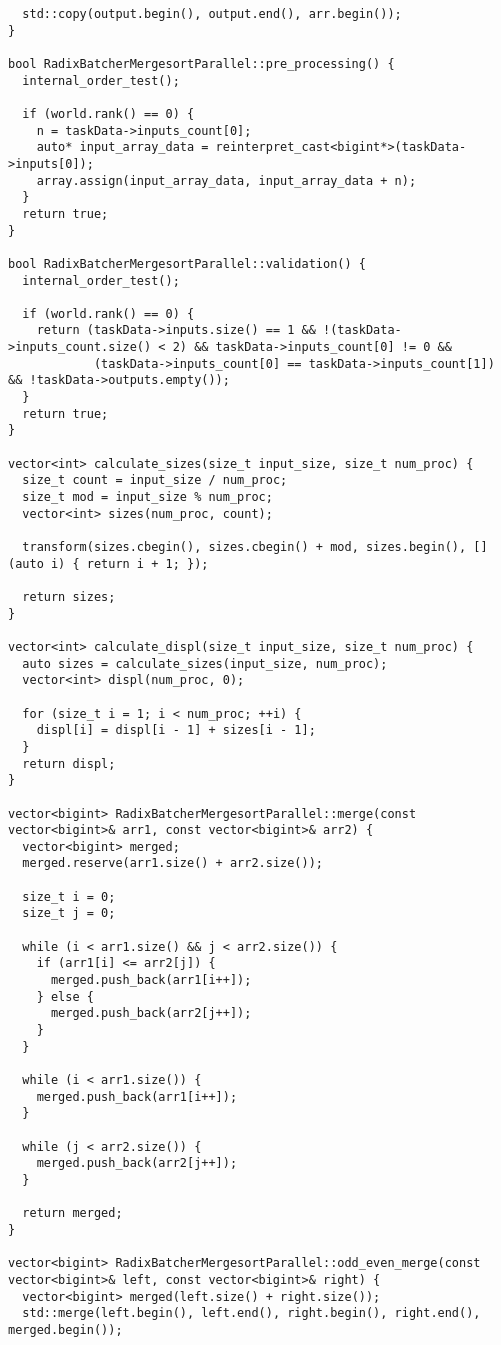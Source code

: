 ﻿\documentclass[a4paper,12pt]{article}
\begin{document}
\begin{lstlisting}
  std::copy(output.begin(), output.end(), arr.begin());
}

bool RadixBatcherMergesortParallel::pre_processing() {
  internal_order_test();

  if (world.rank() == 0) {
    n = taskData->inputs_count[0];
    auto* input_array_data = reinterpret_cast<bigint*>(taskData->inputs[0]);
    array.assign(input_array_data, input_array_data + n);
  }
  return true;
}

bool RadixBatcherMergesortParallel::validation() {
  internal_order_test();

  if (world.rank() == 0) {
    return (taskData->inputs.size() == 1 && !(taskData->inputs_count.size() < 2) && taskData->inputs_count[0] != 0 &&
            (taskData->inputs_count[0] == taskData->inputs_count[1]) && !taskData->outputs.empty());
  }
  return true;
}

vector<int> calculate_sizes(size_t input_size, size_t num_proc) {
  size_t count = input_size / num_proc;
  size_t mod = input_size % num_proc;
  vector<int> sizes(num_proc, count);

  transform(sizes.cbegin(), sizes.cbegin() + mod, sizes.begin(), [](auto i) { return i + 1; });

  return sizes;
}

vector<int> calculate_displ(size_t input_size, size_t num_proc) {
  auto sizes = calculate_sizes(input_size, num_proc);
  vector<int> displ(num_proc, 0);

  for (size_t i = 1; i < num_proc; ++i) {
    displ[i] = displ[i - 1] + sizes[i - 1];
  }
  return displ;
}

vector<bigint> RadixBatcherMergesortParallel::merge(const vector<bigint>& arr1, const vector<bigint>& arr2) {
  vector<bigint> merged;
  merged.reserve(arr1.size() + arr2.size());

  size_t i = 0;
  size_t j = 0;

  while (i < arr1.size() && j < arr2.size()) {
    if (arr1[i] <= arr2[j]) {
      merged.push_back(arr1[i++]);
    } else {
      merged.push_back(arr2[j++]);
    }
  }

  while (i < arr1.size()) {
    merged.push_back(arr1[i++]);
  }

  while (j < arr2.size()) {
    merged.push_back(arr2[j++]);
  }

  return merged;
}

vector<bigint> RadixBatcherMergesortParallel::odd_even_merge(const vector<bigint>& left, const vector<bigint>& right) {
  vector<bigint> merged(left.size() + right.size());
  std::merge(left.begin(), left.end(), right.begin(), right.end(), merged.begin());


\end{lstlisting}
\end{document}
